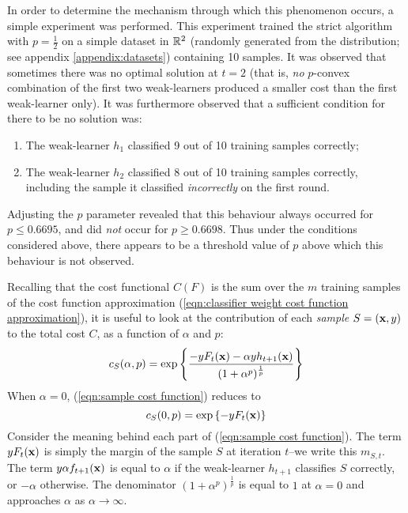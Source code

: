 In order to determine the mechanism through which this phenomenon
occurs, a simple experiment was performed.  This experiment trained
the strict algorithm with $p = \frac{1}{2}$ on a simple dataset in
$\mathbb{R}^2$ (randomly generated from the  distribution; see
appendix \ref{appendix:datasets}) containing 10 samples. 
It was observed that sometimes there was no optimal solution 
at $t=2$ (that is,  \emph{no} $p$-convex combination of the first two
weak-learners produced a smaller cost than the first weak-learner
only).  It was furthermore observed that a sufficient condition for
there to be no solution was: 
%
\begin{enumerate}
\item	The weak-learner $h_1$ classified 9 out of 10 training samples
	correctly; 
\item	The weak-learner $h_2$ classified 8 out of 10 training samples
	correctly, including the sample it classified
	\emph{incorrectly} on the first round.
\end{enumerate}
%
Adjusting the $p$ parameter revealed that this behaviour always
occurred for $p \leq 0.6695$, and did \emph{not} occur for $p \geq
0.6698$.  Thus under the conditions considered above, there appears to
be a threshold value of $p$ above which this behaviour is not
observed.

Recalling that the cost functional $C(F)$ is the sum over the $m$
training samples of the cost function approximation
(\ref{eqn:classifier weight cost function approximation}), it is
useful to look at the contribution of each \emph{sample} $S = (\mathbf{x},
y)$ to the total cost $C$, as a function of $\alpha$ and $p$:
%
\begin{equation}
\label{eqn:sample cost function}
c_S(\alpha, p) = \exp \left\{ \frac{-y F_t(\mathbf{x}) - \alpha y h_{t+1}
(\mathbf{x})}{(1 + \alpha^p)^{\frac{1}{p}}} \right\}
\end{equation}
%
When $\alpha = 0$, (\ref{eqn:sample cost function}) reduces to
%
\begin{equation}
c_S(0, p) = \exp \left\{ -y F_t(\mathbf{x}) \right\}
\end{equation}
%
Consider the meaning behind each part of
(\ref{eqn:sample cost function}).  The term $y F_t(\mathbf{x})$ is simply
the margin of the sample $S$ at iteration $t$--we write this $m_{S,
t}$.  The term $y \alpha f_{t+1}(\mathbf{x})$ is equal to $\alpha$ if the
weak-learner $h_{t+1}$ classifies $S$ correctly, or $-\alpha$
otherwise.  The denominator $(1 + \alpha^p)^{\frac{1}{p}}$ is equal to
$1$ at $\alpha=0$ and approaches $\alpha$ as $\alpha \rightarrow
\infty$.


